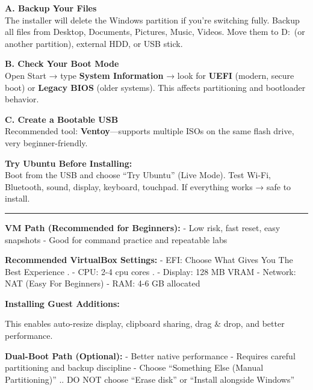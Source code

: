 \documentclass[
  english,
  paper=a4,
  oneside  ,captions=tableheading
]{scrartcl}
\newenvironment{Shaded}{}{}
\newcommand{\AttributeTok}[1]{\textcolor[rgb]{0.49,0.56,0.16}{#1}}
\newcommand{\FunctionTok}[1]{\textcolor[rgb]{0.02,0.16,0.49}{#1}}
\newcommand{\NormalTok}[1]{#1}
\newcommand{\PreprocessorTok}[1]{\textcolor[rgb]{0.74,0.48,0.00}{#1}}
\newcommand{\VariableTok}[1]{\textcolor[rgb]{0.10,0.09,0.49}{#1}}
\begin{document}
\textbf{A. Backup Your Files}\\
The installer will delete the Windows partition if you're switching
fully. Backup all files from Desktop, Documents, Pictures, Music,
Videos. Move them to D:~(or another partition), external HDD, or USB
stick.

\textbf{B. Check Your Boot Mode}\\
Open Start → type \textbf{System Information} → look for \textbf{UEFI}
(modern, secure boot) or \textbf{Legacy BIOS} (older systems). This
affects partitioning and bootloader behavior.

\textbf{C. Create a Bootable USB}\\
Recommended tool: \textbf{Ventoy}---supports multiple ISOs on the same
flash drive, very beginner-friendly.

\textbf{Try Ubuntu Before Installing:}\\
Boot from the USB and choose ``Try Ubuntu'' (Live Mode). Test Wi-Fi,
Bluetooth, sound, display, keyboard, touchpad. If everything works →
safe to install.

\begin{center}\rule{0.5\linewidth}{0.5pt}\end{center}

\textbf{VM Path (Recommended for Beginners):} - Low risk, fast reset,
easy snapshots - Good for command practice and repeatable labs

\textbf{Recommended VirtualBox Settings:} - EFI: Choose What Gives You
The Best Experience . - CPU: 2-4 cpu cores . - Display: 128 MB VRAM -
Network: NAT (Easy For Beginners) - RAM: 4-6 GB allocated

\textbf{Installing Guest Additions:}

\begin{Shaded}
\end{Shaded}

This enables auto-resize display, clipboard sharing, drag \& drop, and
better performance.

\textbf{Dual-Boot Path (Optional):} - Better native performance -
Requires careful partitioning and backup discipline - Choose ``Something
Else (Manual Partitioning)'' .. DO NOT choose ``Erase disk'' or
``Install alongside Windows''
\end{document}
